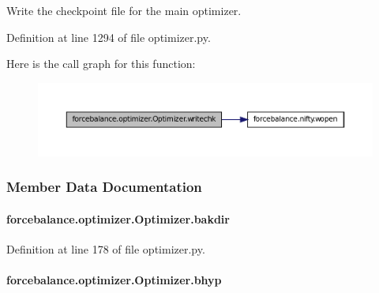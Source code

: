 Write the checkpoint file for the main optimizer. 



Definition at line 1294 of file optimizer.\-py.



Here is the call graph for this function\-:
\nopagebreak
\begin{figure}[H]
\begin{center}
\leavevmode
\includegraphics[width=350pt]{classforcebalance_1_1optimizer_1_1Optimizer_aa7ac7cda43b70ac58ccbd6c8445e88ef_cgraph}
\end{center}
\end{figure}




\subsubsection{Member Data Documentation}
\hypertarget{classforcebalance_1_1optimizer_1_1Optimizer_add421251bd6091e20bbb61ce2e101e8a}{
\paragraph[{bakdir}]{\setlength{\rightskip}{0pt plus 5cm}forcebalance.\-optimizer.\-Optimizer.\-bakdir}}\label{classforcebalance_1_1optimizer_1_1Optimizer_add421251bd6091e20bbb61ce2e101e8a}


Definition at line 178 of file optimizer.\-py.

\hypertarget{classforcebalance_1_1optimizer_1_1Optimizer_a83d94779674511a9d31b780b07ea54fb}{
\paragraph[{bhyp}]{\setlength{\rightskip}{0pt plus 5cm}forcebalance.\-optimizer.\-Optimizer.\-bhyp}}\label{classforcebalance_1_1optimizer_1_1Optimizer_a83d94779674511a9d31b780b07ea54fb}


